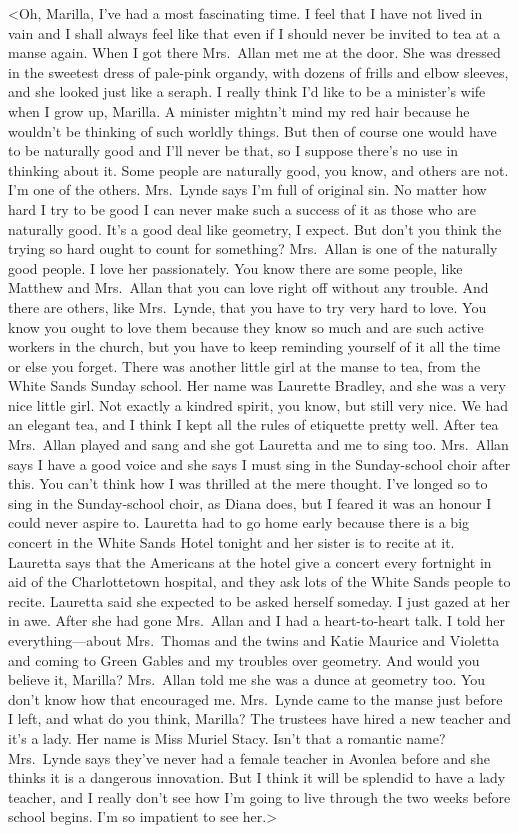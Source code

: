 <Oh, Marilla, I've had a most fascinating time. I feel that I have not lived in vain and I shall always feel like that even if I should never be invited to tea at a manse again. When I got there Mrs.~Allan met me at the door. She was dressed in the sweetest dress of pale-pink organdy, with dozens of frills and elbow sleeves, and she looked just like a seraph. I really think I'd like to be a minister's wife when I grow up, Marilla. A minister mightn't mind my red hair because he wouldn't be thinking of such worldly things. But then of course one would have to be naturally good and I'll never be that, so I suppose there's no use in thinking about it. Some people are naturally good, you know, and others are not. I'm one of the others. Mrs.~Lynde says I'm full of original sin. No matter how hard I try to be good I can never make such a success of it as those who are naturally good. It's a good deal like geometry, I expect. But don't you think the trying so hard ought to count for something? Mrs.~Allan is one of the naturally good people. I love her passionately. You know there are some people, like Matthew and Mrs.~Allan that you can love right off without any trouble. And there are others, like Mrs.~Lynde, that you have to try very hard to love. You know you ought to love them because they know so much and are such active workers in the church, but you have to keep reminding yourself of it all the time or else you forget. There was another little girl at the manse to tea, from the White Sands Sunday school. Her name was Laurette Bradley, and she was a very nice little girl. Not exactly a kindred spirit, you know, but still very nice. We had an elegant tea, and I think I kept all the rules of etiquette pretty well. After tea Mrs.~Allan played and sang and she got Lauretta and me to sing too. Mrs.~Allan says I have a good voice and she says I must sing in the Sunday-school choir after this. You can't think how I was thrilled at the mere thought. I've longed so to sing in the Sunday-school choir, as Diana does, but I feared it was an honour I could never aspire to. Lauretta had to go home early because there is a big concert in the White Sands Hotel tonight and her sister is to recite at it. Lauretta says that the Americans at the hotel give a concert every fortnight in aid of the Charlottetown hospital, and they ask lots of the White Sands people to recite. Lauretta said she expected to be asked herself someday. I just gazed at her in awe. After she had gone Mrs.~Allan and I had a heart-to-heart talk. I told her everything—about Mrs.~Thomas and the twins and Katie Maurice and Violetta and coming to Green Gables and my troubles over geometry. And would you believe it, Marilla? Mrs.~Allan told me she was a dunce at geometry too. You don't know how that encouraged me. Mrs.~Lynde came to the manse just before I left, and what do you think, Marilla? The trustees have hired a new teacher and it's a lady. Her name is Miss Muriel Stacy. Isn't that a romantic name? Mrs.~Lynde says they've never had a female teacher in Avonlea before and she thinks it is a dangerous innovation. But I think it will be splendid to have a lady teacher, and I really don't see how I'm going to live through the two weeks before school begins. I'm so impatient to see her.>